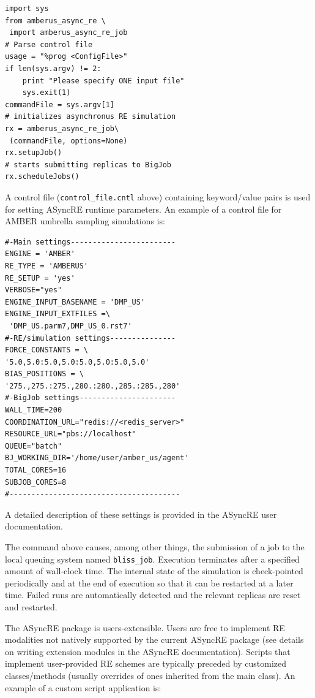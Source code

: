 \documentclass{sig-alternate}
\begin{document}
\begin{lstlisting}[frame=single]
import sys
from amberus_async_re \
 import amberus_async_re_job
# Parse control file
usage = "%prog <ConfigFile>"
if len(sys.argv) != 2:
    print "Please specify ONE input file"
    sys.exit(1)    
commandFile = sys.argv[1]
# initializes asynchronus RE simulation
rx = amberus_async_re_job\
 (commandFile, options=None)
rx.setupJob()
# starts submitting replicas to BigJob
rx.scheduleJobs()
\end{lstlisting}

A control file (\verb+control_file.cntl+ above) containing keyword/value pairs is used for setting ASyncRE runtime parameters. An example of a control file for AMBER umbrella sampling simulations is:

\begin{lstlisting}[frame=single]
#-Main settings------------------------
ENGINE = 'AMBER'
RE_TYPE = 'AMBERUS'
RE_SETUP = 'yes'
VERBOSE="yes"
ENGINE_INPUT_BASENAME = 'DMP_US'
ENGINE_INPUT_EXTFILES =\
 'DMP_US.parm7,DMP_US_0.rst7'
#-RE/simulation settings---------------
FORCE_CONSTANTS = \
'5.0,5.0:5.0,5.0:5.0,5.0:5.0,5.0'
BIAS_POSITIONS = \
'275.,275.:275.,280.:280.,285.:285.,280'
#-BigJob settings----------------------
WALL_TIME=200
COORDINATION_URL="redis://<redis_server>"
RESOURCE_URL="pbs://localhost"
QUEUE="batch"
BJ_WORKING_DIR='/home/user/amber_us/agent'
TOTAL_CORES=16
SUBJOB_CORES=8
#---------------------------------------
\end{lstlisting}

A detailed description of these settings is provided in the ASyncRE user documentation.


The command above causes, among other things, the submission of a job
to the local queuing system named \verb+bliss_job+. Execution terminates after a specified amount of
wall-clock time. The internal state of the simulation is check-pointed
periodically and at the end of execution so that it can be restarted
at a later time. Failed runs are automatically detected
and the relevant replicas are reset and restarted.

The ASyncRE package is users-extensible. Users are free to implement
RE modalities not natively supported by the current ASyncRE package
(see details on writing extension modules in the ASyncRE
documentation). Scripts that implement user-provided RE schemes are
typically preceded by customized classes/methods (usually overrides of
ones inherited from the main class). An example of a custom script application is:
\end{document}
